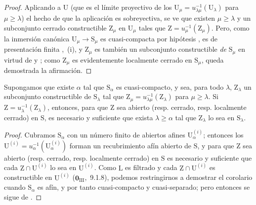 \begin{proof}
Aplicando a $\mathrm{U}$ (que es el límite proyectivo de los $\mathrm{U}_\mu=u_{\lambda\mu}^{-1}(\mathrm{U}_\lambda)$ para $\mu\geqslant\lambda$) el hecho de que la aplicación  es sobreyectiva, se ve que existen $\mu\geqslant\lambda$ y un subconjunto cerrado constructible $\mathrm{Z}_\mu$ en $\mathrm{U}_\mu$ tales que $\mathrm{Z}=u_\mu^{-1}(\mathrm{Z}_\mu)$.
Pero, como la inmersión canónica $\mathrm{U}_\mu\to\mathrm{S}_\mu$ es cuasi-compacta por hipótesis , es de presentación finita ,~(i), y $\mathrm{Z}_\mu$ es también un subconjunto constructible \emph{de} $\mathrm{S}_\mu$ en virtud de  y ; como $\mathrm{Z}_\mu$ es evidentemente localmente cerrado en $\mathrm{S}_\mu$, queda demostrada la afirmación.
\end{proof}

\begin{corollary}[8.3.12]
\label{IV.8.3.12}
Supongamos que existe $\alpha$ tal que $\mathrm{S}_\alpha$ es cuasi-compacto, y sea, para todo $\lambda$, $\mathrm{Z}_\lambda$ un subconjunto constructible de $\mathrm{S}_\lambda$ tal que $\mathrm{Z}_\mu=u_{\lambda\mu}^{-1}(\mathrm{Z}_\lambda)$ para $\mu\geqslant\lambda$.
Si $\mathrm{Z}=u_\lambda^{-1}(\mathrm{Z}_\lambda)$,
entonces, para que $\mathrm{Z}$ sea abierto (resp. cerrado, resp. localmente cerrado) en $\mathrm{S}$, es necesario y suficiente que exista $\lambda\geqslant\alpha$ tal que $\mathrm{Z}_\lambda$ lo sea en $\mathrm{S}_\lambda$.
\end{corollary}

\begin{proof}
Cubramos $\mathrm{S}_\alpha$ con un número finito de abiertos afines $\mathrm{U}_\alpha^{(i)}$; entonces los $\mathrm{U}^{(i)}=u_\alpha^{-1}(\mathrm{U}_\alpha^{(i)})$ forman un recubrimiento afín abierto de $\mathrm{S}$, y para que $\mathrm{Z}$ sea abierto (resp. cerrado, resp. localmente cerrado) en $\mathrm{S}$ es necesario y suficiente que cada $\mathrm{Z}\cap\mathrm{U}^{(i)}$ lo sea en $\mathrm{U}^{(i)}$.
Como $\mathrm{L}$ es filtrado y cada $\mathrm{Z}\cap\mathrm{U}^{(i)}$ es constructible en $\mathrm{U}^{(i)}$ ($\mathbf{0}_{\mathrm{III}}$,~9.1.8), podemos restringirnos a demostrar el corolario cuando $\mathrm{S}_\alpha$ es afín, y por tanto cuasi-compacto y cuasi-separado; pero entonces se sigue de .
\end{proof}

